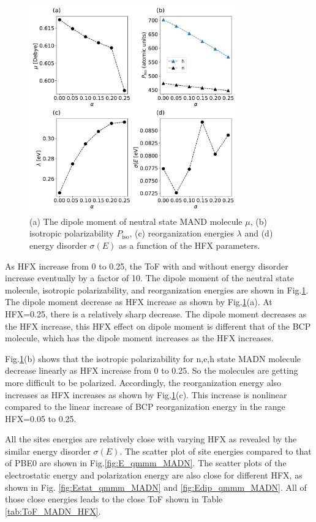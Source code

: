 \documentclass[letterpaper,12pt]{article}
\begin{document}
%
\begin{figure}[H]
    \centering
    \includegraphics[width=0.80\textwidth]{figs/MADN_HFX/fig_autogen.pdf}
    \caption{(a) The dipole moment of neutral state MAND molecule $\mu$, (b) isotropic polarizability $P_\text{iso}$, (c) reorganization energies $\lambda$ and (d) energy disorder $\sigma(E)$ as a function of the HFX parameters.}
    \label{fig:autogen_MADN}
\end{figure}
% 
As HFX increase from 0 to 0.25, the ToF with and without energy disorder increase eventually by a factor of 10. 
The dipole moment of the neutral state molecule, isotropic polarizability, and reorganization energies are shown in Fig.\ref{fig:autogen_MADN}. The dipole moment decrease as HFX increase as shown by Fig.\ref{fig:autogen_MADN}(a). At HFX=0.25, there is a relatively sharp decrease. The dipole moment decreases as the HFX increase, this HFX effect on dipole moment is different that of the BCP molecule, which has the dipole moment increases as the HFX increases.

Fig.\ref{fig:autogen_MADN}(b) shows that the isotropic polarizability for n,e,h state MADN molecule decrease linearly as HFX increase from 0 to 0.25. 
So the molecules are getting more difficult to be polarized. 
Accordingly, the reorganization energy also increases as HFX increases as shown by Fig.\ref{fig:autogen_MADN}(c). This increase is nonlinear compared to the linear increase of BCP reorganization energy in the range HFX=0.05 to 0.25. 


All the sites energies are relatively close with varying HFX as revealed by the similar energy disorder $\sigma(E)$. The scatter plot of site energies compared to that of PBE0 are shown in Fig.\ref{fig:E_qmmm_MADN}. The scatter plots of the electrostatic energy and polarization energy are also close for different HFX, as shown in Fig. \ref{fig:Estat_qmmm_MADN} and \ref{fig:Edip_qmmm_MADN}. All of those close energies leads to the close ToF shown in Table \ref{tab:ToF_MADN_HFX}.
\end{document}
